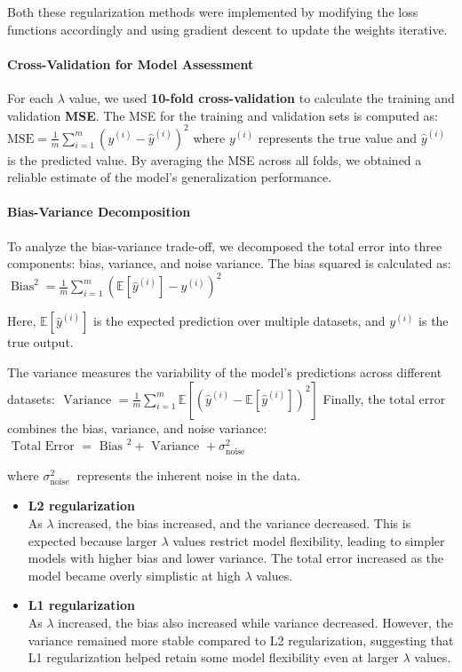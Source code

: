 \documentclass{article}
\begin{document}
Both these regularization methods were implemented by modifying the loss functions accordingly and using gradient descent to update the weights iterative.

\paragraph{Cross-Validation for Model Assessment}
For each $\lambda$ value, we used \textbf{10-fold cross-validation} to calculate the training and validation \textbf{MSE}. The MSE for the training and validation sets is computed as: $\mathrm{MSE}=\frac{1}{m} \sum_{i=1}^m\left(y^{(i)}-\hat{y}^{(i)}\right)^2$
where $y^{(i)}$ represents the true value and $\hat{y}^{(i)}$ is the predicted value. By averaging the MSE across all folds, we obtained a reliable estimate of the model's generalization performance.

\paragraph{Bias-Variance Decomposition}
To analyze the bias-variance trade-off, we decomposed the total error into three components: bias, variance, and noise variance. The bias squared is calculated as: $\operatorname{Bias}^2=\frac{1}{m} \sum_{i=1}^m\left(\mathbb{E}\left[\hat{y}^{(i)}\right]-y^{(i)}\right)^2$


Here, $\mathbb{E}\left[\hat{y}^{(i)}\right]$ is the expected prediction over multiple datasets, and $y^{(i)}$ is the true output.

The variance measures the variability of the model's predictions across different datasets:
$\text { Variance }=\frac{1}{m} \sum_{i=1}^m \mathbb{E}\left[\left(\hat{y}^{(i)}-\mathbb{E}\left[\hat{y}^{(i)}\right]\right)^2\right]
$
Finally, the total error combines the bias, variance, and noise variance: $\text { Total Error }=\text { Bias }^2+\text { Variance }+\sigma_{\text {noise }}^2$

where $\sigma_{\text {noise }}^2$ represents the inherent noise in the data.

\begin{itemize}
    \item \textbf{L2 regularization} \\
    As $\lambda$ increased, the bias increased, and the variance decreased. This is expected because larger $\lambda$ values restrict model flexibility, leading to simpler models with higher bias and lower variance. The total error increased as the model became overly simplistic at high $\lambda$ values.

    \item \textbf{L1 regularization} \\
     As $\lambda$ increased, the bias also increased while variance decreased. However, the variance remained more stable compared to L2 regularization, suggesting that L1 regularization helped retain some model flexibility even at larger $\lambda$ values.
\end{itemize}
\end{document}
